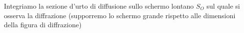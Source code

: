 Integriamo la sezione d’urto di diffusione sullo schermo lontano $ S_O$ sul quale si osserva la diffrazione
(supporremo lo schermo grande rispetto alle dimensioni della figura di diffrazione)
